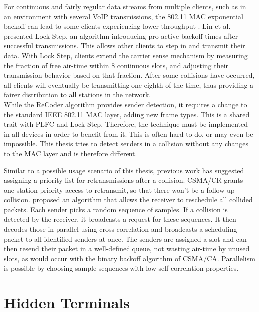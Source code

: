 For continuous and fairly regular data streams from multiple clients, such as in an environment with several VoIP transmissions, the 802.11 \gls{MAC} exponential backoff can lead to some clients experiencing lower throughput \cite{lin2009}. Lin et al. presented Lock Step, an algorithm introducing pro-active backoff times after successful transmissions. This allows other clients to step in and transmit their data. With Lock Step, clients extend the carrier sense mechanism by measuring the fraction of free air-time within 8 continuous slots, and adjusting their transmission behavior based on that fraction. After some collisions have occurred, all clients will eventually be transmitting one eighth of the time, thus providing a fairer distribution to all stations in the network.\\

While the ReCoder algorithm provides sender detection, it requires a change to the standard IEEE 802.11 \gls{MAC} layer, adding new frame types. This is a shared trait with \gls{PLFC} and Lock Step. Therefore, the technique must be implemented in all devices in order to benefit from it. This is often hard to do, or may even be impossible. This thesis tries to detect senders in a collision without any changes to the \gls{MAC} layer and is therefore different.

Similar to a possible usage scenario of this thesis, previous work has suggested assigning a priority list for retransmissions after a collision. \gls{CSMA/CR} \cite{choi2013} grants one station priority access to retransmit, so that there won't be a follow-up collision. \cite{zhao2015} proposed an algorithm that allows the receiver to reschedule all collided packets. Each sender picks a random sequence of samples. If a collision is detected by the receiver, it broadcasts a request for these sequences. It then decodes those in parallel using cross-correlation and broadcasts a scheduling packet to all identified senders at once. The senders are assigned a slot and can then resend their packet in a well-defined queue, not wasting air-time by unused slots, as would occur with the binary backoff algorithm of \gls{CSMA/CA}. Parallelism is possible by choosing sample sequences with low self-correlation properties.



\section{Hidden Terminals}

